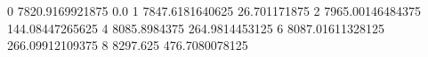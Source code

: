 0 7820.9169921875 0.0
1 7847.6181640625 26.701171875
2 7965.00146484375 144.08447265625
4 8085.8984375 264.9814453125
6 8087.01611328125 266.09912109375
8 8297.625 476.7080078125
